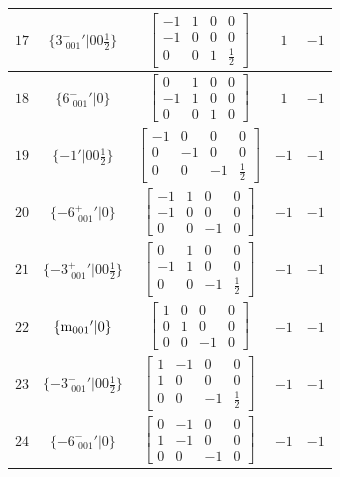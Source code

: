 \documentclass[fleqn,8pt]{jsarticle}
\begin{document}
\begin{longtable}{ccccc}
$ 17 $ & $ \{3^{-}_{\,\,001}{}'|0 0 \frac{1}{2}\} $ & $ \begin{bmatrix} -1 & 1 & 0 & 0 \\ -1 & 0 & 0 & 0 \\ 0 & 0 & 1 & \frac{1}{2} \end{bmatrix} $ & $ 1 $ & $ -1 $ \\ \hline
$ 18 $ & $ \{6^{-}_{\,\,001}{}'|0\} $ & $ \begin{bmatrix} 0 & 1 & 0 & 0 \\ -1 & 1 & 0 & 0 \\ 0 & 0 & 1 & 0 \end{bmatrix} $ & $ 1 $ & $ -1 $ \\ \hline
$ 19 $ & $ \{-1{}'|0 0 \frac{1}{2}\} $ & $ \begin{bmatrix} -1 & 0 & 0 & 0 \\ 0 & -1 & 0 & 0 \\ 0 & 0 & -1 & \frac{1}{2} \end{bmatrix} $ & $ -1 $ & $ -1 $ \\ \hline
$ 20 $ & $ \{-6^{+}_{\,\,001}{}'|0\} $ & $ \begin{bmatrix} -1 & 1 & 0 & 0 \\ -1 & 0 & 0 & 0 \\ 0 & 0 & -1 & 0 \end{bmatrix} $ & $ -1 $ & $ -1 $ \\ \hline
$ 21 $ & $ \{-3^{+}_{\,\,001}{}'|0 0 \frac{1}{2}\} $ & $ \begin{bmatrix} 0 & 1 & 0 & 0 \\ -1 & 1 & 0 & 0 \\ 0 & 0 & -1 & \frac{1}{2} \end{bmatrix} $ & $ -1 $ & $ -1 $ \\ \hline
$ 22 $ & $ \{{\rm m}_{001}{}'|0\} $ & $ \begin{bmatrix} 1 & 0 & 0 & 0 \\ 0 & 1 & 0 & 0 \\ 0 & 0 & -1 & 0 \end{bmatrix} $ & $ -1 $ & $ -1 $ \\ \hline
$ 23 $ & $ \{-3^{-}_{\,\,001}{}'|0 0 \frac{1}{2}\} $ & $ \begin{bmatrix} 1 & -1 & 0 & 0 \\ 1 & 0 & 0 & 0 \\ 0 & 0 & -1 & \frac{1}{2} \end{bmatrix} $ & $ -1 $ & $ -1 $ \\ \hline
$ 24 $ & $ \{-6^{-}_{\,\,001}{}'|0\} $ & $ \begin{bmatrix} 0 & -1 & 0 & 0 \\ 1 & -1 & 0 & 0 \\ 0 & 0 & -1 & 0 \end{bmatrix} $ & $ -1 $ & $ -1 $ \\
\end{longtable}
\end{document}
